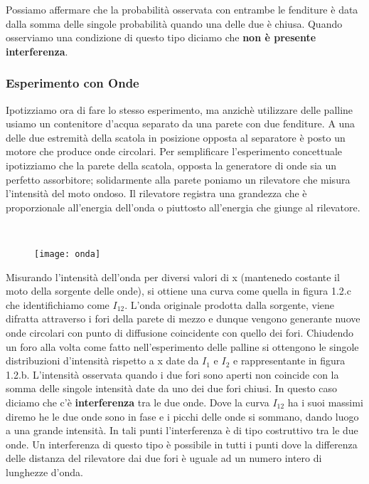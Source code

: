\noindent Possiamo affermare che la probabilit\`a osservata con entrambe le fenditure \`{e} data dalla somma delle singole probabilit\`a quando una delle due \`e chiusa. Quando osserviamo una condizione di questo tipo diciamo che \textbf{non \`e presente interferenza}.

\subsubsection{Esperimento con Onde}

Ipotizziamo ora di fare lo stesso esperimento, ma anzich\`e utilizzare delle palline usiamo un contenitore d'acqua separato da una parete con due fenditure. A una delle due estremit\`a della scatola in posizione opposta al separatore \`e posto un motore che produce onde circolari. Per semplificare l'esperimento concettuale ipotizziamo che la parete della scatola, opposta la generatore di onde sia un perfetto assorbitore; solidarmente alla parete poniamo un rilevatore che misura l'intensit\`a del moto ondoso. \newline
Il rilevatore registra una grandezza che \`e proporzionale all'energia dell'onda o piuttosto all'energia che giunge al rilevatore.

\ 
\begin{figure}[!ht]
\vspace{0.1in}
\texttt{[image: onda]}	
\centering
\vspace{0.1in}
\caption{}
\end{figure}

Misurando l'intensit\`a dell'onda per diversi valori di x (mantenedo costante il moto della sorgente delle onde), si ottiene una curva come quella in figura 1.2.c che identifichiamo come $I_{12}$. L'onda originale prodotta dalla sorgente, viene difratta attraverso i fori della parete di mezzo e dunque vengono generante nuove onde circolari con punto di diffusione coincidente con quello dei fori. Chiudendo un foro alla volta come fatto nell'esperimento delle palline si ottengono le singole distribuzioni d'intensit\`{a} rispetto a x date da $I_1$ e $I_2$ e rappresentante in figura 1.2.b. L'intensit\`{a} osservata quando i due fori sono aperti non coincide con la somma delle singole intensit\`a date da uno dei due fori chiusi. In questo caso diciamo che c'\`e \textbf{interferenza} tra le due onde. Dove la curva $I_{12}$ ha i suoi massimi diremo he le due onde sono in fase e i picchi delle onde si sommano, dando luogo a una grande intensit\`a. In tali punti l'interferenza \`e di tipo costruttivo tra le due onde. Un interferenza di questo tipo \`e possibile in tutti i punti dove la differenza delle distanza del rilevatore dai due fori \`e uguale ad un numero intero di lunghezze d'onda.

